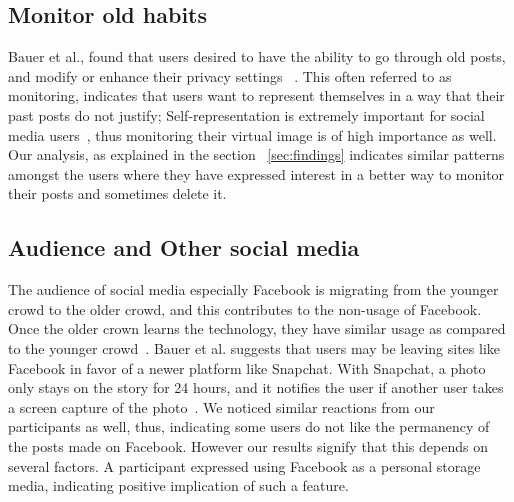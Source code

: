 \subsection{Monitor old habits}
Bauer et al., found that users desired to have the ability to go through old posts, and modify or enhance their privacy settings ~\cite{bauer2013post}. This often referred to as monitoring, indicates that users want to represent themselves in a way that their past posts do not justify; Self-representation is extremely important for social media users~\cite{dimicco2007identity,zhao2008identity}, thus monitoring their virtual image is of high importance as well. Our analysis, as explained in the section ~\ref{sec:findings} indicates similar patterns amongst the users where they have expressed interest in a better way to monitor their posts and sometimes delete it. %
\subsection{Audience and Other social media}
The audience of social media especially Facebook is migrating from the younger crowd to the older crowd, and this contributes to the non-usage of Facebook. Once the older crown learns the technology, they have similar usage as compared to the younger crowd~\cite{bucur1999older}. Bauer et al. suggests that users may be leaving sites like Facebook in favor of a newer platform like Snapchat. With Snapchat, a photo only stays on the story for 24 hours, and it notifies the user if another user takes a screen capture of the photo~\cite{bauer2013post}. We noticed similar reactions from our participants as well, thus, indicating some users do not like the permanency of the posts made on Facebook. However our results signify that this depends on several factors. A participant expressed using Facebook as a personal storage media, indicating positive implication of such a feature. 
